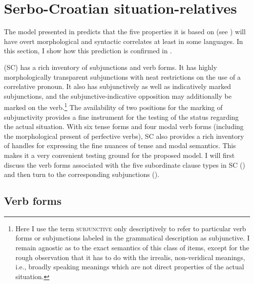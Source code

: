 \documentclass[output=paper,
colorlinks,
citecolor=brown,
newtxmath
]{langscibook}
\begin{document}

\section{Serbo-Croatian situation-relatives}\label{sec:SC-c-rel}

The model presented in  predicts that the five properties it is based on (see ) will have overt morphological and syntactic correlates at least in some languages. In this section, I show how this prediction is confirmed in .

 (SC) has a rich inventory of subjunctions and verb forms. It has highly morphologically transparent subjunctions with neat restrictions on the use of a correlative pronoun. It also has subjunctively as well as indicatively marked subjunctions, and the subjunctive-indicative opposition may additionally be marked on the verb.\footnote{Here I use the term \textsc{subjunctive} only descriptively to refer to particular verb forms or subjunctions labeled in the grammatical description as subjunctive. I remain agnostic as to the exact semantics of this class of items, except for the rough observation that it has to do with the irrealis, non-veridical meanings, i.e., broadly speaking meanings which are not direct properties of the actual situation.} The availability of two positions for the marking of subjunctivity provides a fine instrument for the testing of the status regarding the actual situation. With six tense forms and four modal verb forms (including the morphological present of perfective verbs), SC also provides a rich inventory of handles for expressing the fine nuances of tense and modal semantics. This makes it a very convenient testing ground for the proposed model. I will first discuss the verb forms associated with the five subordinate clause types in SC  () and then turn to the corresponding subjunctions ().

\subsection{Verb forms}\label{verbforms}
\end{document}
